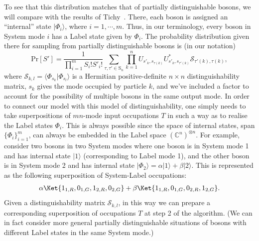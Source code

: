 To see that this distribution matches that of partially distinguishable bosons, we will compare with the results of Tichy~\cite{tichy2015}.
There, each boson is assigned an ``internal'' state $|\Phi_i\rangle$, where $i=1, \cdots, m$.
Thus, in our terminology, every boson in System mode $i$ has a Label state given by $\Phi_i$.
The probability distribution given there for sampling from partially distinguishable bosons is (in our notation)
\begin{equation}\label{eq:TichyDist}
\textrm{Pr}[S'] =  \frac{1}{\prod_{i=1}^m S_i! S'_i!} \sum_{\tau, \tau' \in \textrm{S}_n} \prod_{k=1}^n U_{s'_k,s_{\tau(k)}} U^\ast_{s'_k,s_{{\tau'}(k)}} \mathcal{S}_{{\tau'(k)},{\tau(k)}},
\end{equation}
where $\mathcal{S}_{k,l} = \langle \Phi_{s_k}|\Phi_{s_l}\rangle$ is a Hermitian positive-definite $n \times n$ distinguishability matrix, $s_k$ gives the mode occupied by particle $k$, and we've included a factor to account for the possibility of multiple bosons in the same output mode.
In order to connect our model with this model of distinguishability, one simply needs to take superpositions of $mn$-mode input occupations $T$ in such a way as to realise the Label states $\Phi_i$.
This is always possible since the space of internal states, span$\{\Phi_i\}_{i=1}^m$, can always be embedded in the Label space $(\mathbb{C}^n)^{\otimes n}$.
For example, consider two bosons in two System modes where one boson is in System mode 1 and has internal state $|1\rangle$ (corresponding to Label mode 1), and the other boson is in System mode 2 and has internal state $|\Phi_2\rangle=\alpha|1\rangle+\beta|2\rangle$.
This is represented as the following superposition of System-Label occupations:
\begin{align}
\alpha \Ket{1_{1,R}, 0_{1,G}, 1_{2,R}, 0_{2,G}} + \beta \Ket{1_{1,R}, 0_{1,G}, 0_{2,R}, 1_{2,G}} .
\end{align}
Given a distinguishability matrix $\mathcal{S}_{k,l}$, in this way we can prepare a corresponding superposition of occupations $T$ at step 2 of the algorithm.
(We can in fact consider more general partially distinguishable situations of bosons with different Label states in the same System mode.)


